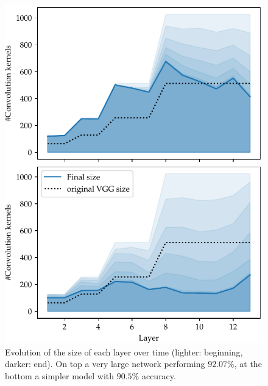 \begin{figure}[htb]
\begin{center}
\includegraphics[width=.7\columnwidth]{size_evolution}
\vspace*{-5mm} 
\caption{ Evolution of the size of
  each layer over time (lighter: beginning, darker: end). On top a very large
  network performing $92.07\%$, at the bottom a simpler model with $90.5\%$
  accuracy. 
} 
\label{fig:network_size_evolution}
\end{center}
\vspace*{-4mm}
\end{figure}

